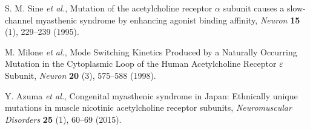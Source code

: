 S. M. Sine {\em et al.}, Mutation of the acetylcholine receptor $\alpha$ subunit causes a slow-channel myasthenic syndrome by enhancing agonist binding affinity, {\em Neuron} {\bf 15} (1), 229--239 (1995).

M. Milone {\em et al.}, Mode Switching Kinetics Produced by a Naturally Occurring Mutation in the Cytoplasmic Loop of the Human Acetylcholine Receptor $\varepsilon$ Subunit, {\em Neuron} {\bf 20} (3), 575--588 (1998).

Y. Azuma {\em et al.}, Congenital myasthenic syndrome in Japan: Ethnically unique mutations in muscle nicotinic acetylcholine receptor subunits, {\em Neuromuscular Disorders} {\bf 25} (1), 60--69 (2015).
